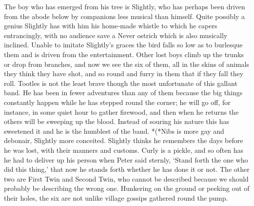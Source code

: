\begin{stagedir}
The boy who has emerged from his tree is Slightly,
who has perhaps been driven from the abode below by companions less musical than himself.
Quite possibly a genius Slightly has with him his home‐made whistle to which he capers entrancingly,
with no audience save a Never ostrich which is also musically inclined.
Unable to imitate Slightly’s graces the bird falls so low as to burlesque them
and is driven from the entertainment.
Other lost boys climb up the trunks or drop from branches,
and now we see the six of them, all in the skins of animals they think they have shot,
and so round and furry in them that if they fall they roll.
Tootles is not the least brave though the most unfortunate of this gallant band.
He has been in fewer adventures than any of them
because the big things constantly happen while he has stepped round the corner;
he will go off, for instance, in some quiet hour to gather firewood,
and then when he returns the others will be sweeping up the blood.
Instead of souring his nature this has sweetened it and he is the humblest of the band.
*(*Nibs is more gay and debonair, Slightly more conceited.
Slightly thinks he remembers the days before he was lost, with their manners and customs.
Curly is a pickle, and so often has he had to deliver up his person when Peter said sternly,
‘Stand forth the one who did this thing,’ that now he stands forth whether he has done it or not.
The other two are First Twin and Second Twin,
who cannot be described because we should probably be describing the wrong one.
Hunkering on the ground or peeking out of their holes,
the six are not unlike village gossips gathered round the pump.
\end{stagedir}

